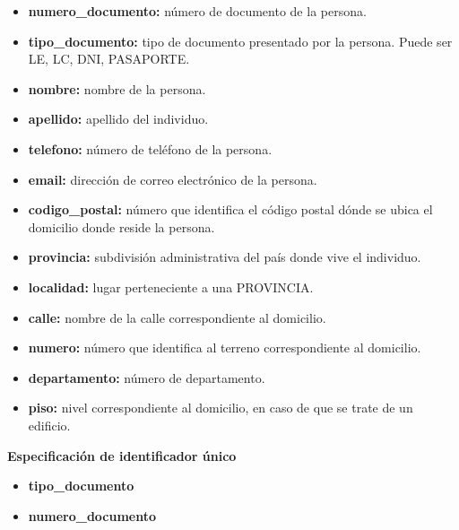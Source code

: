 \documentclass[a4paper,11pt]{article}
\begin{document}
\begin{itemize}

  \item \textbf{numero\_documento:} número de documento de la persona.

   \item \textbf{tipo\_documento:} tipo de documento presentado por la persona. Puede ser 
   LE, LC, DNI, PASAPORTE.

   \item \textbf{nombre:} nombre de la persona.

   \item \textbf{apellido:} apellido del individuo.

   \item \textbf{telefono:} número de teléfono de la persona.

   \item \textbf{email:} dirección de correo electrónico de la persona.

   \item \textbf{codigo\_postal:} número que identifica el código postal dónde se ubica el domicilio donde reside la persona.

   \item \textbf{provincia:} subdivisión administrativa del país donde vive el individuo.

   \item \textbf{localidad:} lugar perteneciente a una PROVINCIA.

   \item \textbf{calle:} nombre de la calle correspondiente al domicilio.

   \item \textbf{numero:} número que identifica al terreno correspondiente al domicilio.
   
   \item \textbf{departamento:} número de departamento.
   
   \item \textbf{piso:} nivel correspondiente al domicilio, en caso de que se trate de un edificio.

 \end{itemize}

\textbf{Especificación de identificador único}

\begin{itemize}

    \item \textbf{tipo\_documento}

    \item \textbf{numero\_documento}

\end{itemize}
\end{document}
